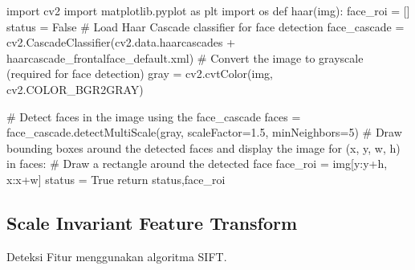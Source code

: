 \documentclass[
  letterpaper,
  DIV=11,
  numbers=noendperiod]{scrreprt}
\newenvironment{Shaded}{\begin{snugshade}}{\end{snugshade}}
\newcommand{\CommentTok}[1]{\textcolor[rgb]{0.37,0.37,0.37}{#1}}
\newcommand{\ControlFlowTok}[1]{\textcolor[rgb]{0.00,0.23,0.31}{#1}}
\newcommand{\DecValTok}[1]{\textcolor[rgb]{0.68,0.00,0.00}{#1}}
\newcommand{\FloatTok}[1]{\textcolor[rgb]{0.68,0.00,0.00}{#1}}
\newcommand{\ImportTok}[1]{\textcolor[rgb]{0.00,0.46,0.62}{#1}}
\newcommand{\KeywordTok}[1]{\textcolor[rgb]{0.00,0.23,0.31}{#1}}
\newcommand{\NormalTok}[1]{\textcolor[rgb]{0.00,0.23,0.31}{#1}}
\newcommand{\OperatorTok}[1]{\textcolor[rgb]{0.37,0.37,0.37}{#1}}
\newcommand{\StringTok}[1]{\textcolor[rgb]{0.13,0.47,0.30}{#1}}
\newcommand{\VariableTok}[1]{\textcolor[rgb]{0.07,0.07,0.07}{#1}}
\begin{document}
\begin{Shaded}
\begin{Highlighting}[]
\ImportTok{import}\NormalTok{ cv2}
\ImportTok{import}\NormalTok{ matplotlib.pyplot }\ImportTok{as}\NormalTok{ plt}
\ImportTok{import}\NormalTok{ os}
\KeywordTok{def}\NormalTok{ haar(img):}
\NormalTok{    face\_roi }\OperatorTok{=}\NormalTok{ []}
\NormalTok{    status }\OperatorTok{=} \VariableTok{False}
    \CommentTok{\# Load Haar Cascade classifier for face detection}
\NormalTok{    face\_cascade }\OperatorTok{=}\NormalTok{ cv2.CascadeClassifier(cv2.data.haarcascades }\OperatorTok{+} \StringTok{\textquotesingle{}haarcascade\_frontalface\_default.xml\textquotesingle{}}\NormalTok{)}
    \CommentTok{\# Convert the image to grayscale (required for face detection)}
\NormalTok{    gray }\OperatorTok{=}\NormalTok{ cv2.cvtColor(img, cv2.COLOR\_BGR2GRAY)}

    \CommentTok{\# Detect faces in the image using the face\_cascade}
\NormalTok{    faces }\OperatorTok{=}\NormalTok{ face\_cascade.detectMultiScale(gray, scaleFactor}\OperatorTok{=}\FloatTok{1.5}\NormalTok{, minNeighbors}\OperatorTok{=}\DecValTok{5}\NormalTok{)}
    \CommentTok{\# Draw bounding boxes around the detected faces and display the image}
    \ControlFlowTok{for}\NormalTok{ (x, y, w, h) }\KeywordTok{in}\NormalTok{ faces:}
        \CommentTok{\# Draw a rectangle around the detected face}
\NormalTok{        face\_roi }\OperatorTok{=}\NormalTok{ img[y:y}\OperatorTok{+}\NormalTok{h, x:x}\OperatorTok{+}\NormalTok{w]}
\NormalTok{        status }\OperatorTok{=} \VariableTok{True}
    \ControlFlowTok{return}\NormalTok{ status,face\_roi}
\end{Highlighting}
\end{Shaded}

\hypertarget{scale-invariant-feature-transform}{%
\subsection*{Scale Invariant Feature
Transform}\label{scale-invariant-feature-transform}}

Deteksi Fitur menggunakan algoritma SIFT.
\end{document}
